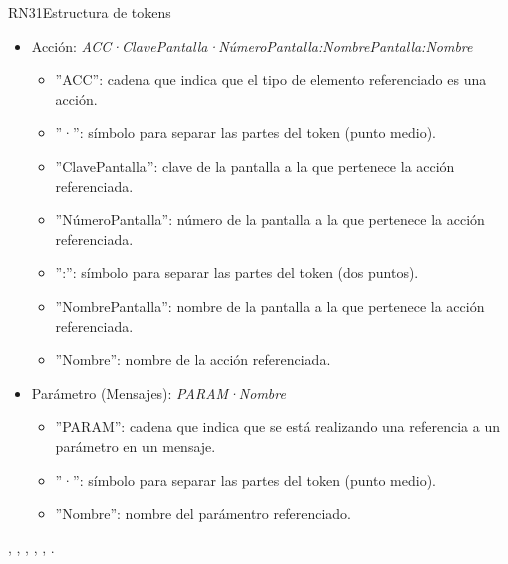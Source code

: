 \begin{BussinesRule}{RN31}{Estructura de tokens}
\begin{itemize}
\begin{itemize}
			\item '':'': símbolo para separar las partes del token (dos puntos).
			\item ''NombreCasoUso'': nombre del caso de uso al que pertenece el paso referenciado.
			\item ''ClaveTrayectoria'': clave de la trayectoria a la que pertenece el paso referenciado.
			\item ''Número'': número del paso referenciado.
		\end{itemize}
	\item Acción: {\em ACC·ClavePantalla·NúmeroPantalla:NombrePantalla:Nombre}
		\begin{itemize}
			\item ''ACC'': cadena que indica que el tipo de elemento referenciado es una acción.
			\item ''·'':  símbolo para separar las partes del token (punto medio).
			\item ''ClavePantalla'': clave de la pantalla a la que pertenece la acción referenciada.
			\item ''NúmeroPantalla'': número de la pantalla a la que pertenece la acción referenciada.
			\item '':'': símbolo para separar las partes del token (dos puntos).
			\item ''NombrePantalla'': nombre de la pantalla a la que pertenece la acción referenciada.
			\item ''Nombre'': nombre de la acción referenciada.
		\end{itemize}
	\item Parámetro (Mensajes): {\em PARAM·Nombre}
		\begin{itemize}
			\item ''PARAM'': cadena que indica que se está realizando una referencia a un parámetro en un mensaje.
			\item ''·'':  símbolo para separar las partes del token (punto medio).
			\item ''Nombre'': nombre del parámentro referenciado.
		\end{itemize}
	\end{itemize}
	 , , , , , . 
\end{BussinesRule}


